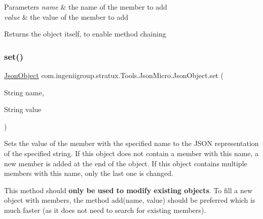 \begin{DoxyParams}{Parameters}
{\em name} & the name of the member to add \\
\hline
{\em value} & the value of the member to add \\
\hline
\end{DoxyParams}
\begin{DoxyReturn}{Returns}
the object itself, to enable method chaining 
\end{DoxyReturn}
\mbox{\label{classcom_1_1ingeniigroup_1_1stratux_1_1_tools_1_1_json_micro_1_1_json_object_a757f1ffbfe9c01ea5a8345bcac022cbb}} 
\subsubsection{\texorpdfstring{set()}{set()}\hspace{0.1cm}{\footnotesize\ttfamily [6/7]}}
{\footnotesize\ttfamily \hyperlink{classcom_1_1ingeniigroup_1_1stratux_1_1_tools_1_1_json_micro_1_1_json_object}{Json\+Object} com.\+ingeniigroup.\+stratux.\+Tools.\+Json\+Micro.\+Json\+Object.\+set (\begin{DoxyParamCaption}\item[{String}]{name,  }\item[{String}]{value }\end{DoxyParamCaption})}

Sets the value of the member with the specified name to the J\+S\+ON representation of the specified string. If this object does not contain a member with this name, a new member is added at the end of the object. If this object contains multiple members with this name, only the last one is changed. 

This method should {\bfseries only be used to modify existing objects}. To fill a new object with members, the method {\ttfamily add(name, value)} should be preferred which is much faster (as it does not need to search for existing members). 



